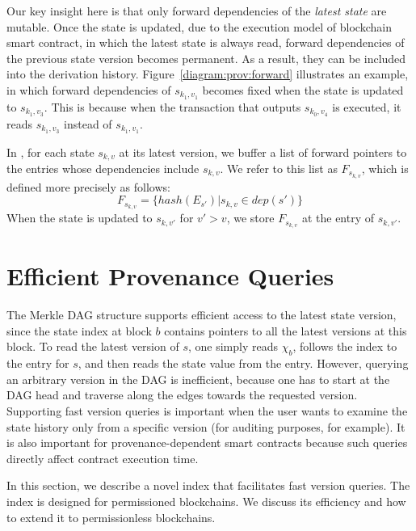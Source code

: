 Our key insight here is that only forward dependencies of the {\em latest state} are mutable. Once the state
is updated, due to the execution model of blockchain smart contract, in which the latest state is always read,
forward dependencies of the previous state version becomes permanent. As a result, they can be included into
the derivation history. Figure~\ref{diagram:prov:forward} illustrates an example, in which forward dependencies of
$s_{k_1, v_1}$ becomes fixed when the state is updated to $s_{k_1, v_3}$. This is because when the transaction
that
outputs $s_{k_0, v_4}$ is executed, it reads $s_{k_1, v_3}$ instead of $s_{k_1, v_1}$. 

In {\fs}, for each state $s_{k,v}$ at its latest version, we buffer a list of forward pointers to the
entries whose dependencies include $s_{k,v}$.  We refer to this list as $F_{s_{k,v}}$, which is defined more precisely as
follows: 
\begin{displaymath}
F_{s_{k,v}} = \{hash (E_{s'}) | s_{k,v} \in dep(s')\}
\end{displaymath}
\noindent When the state is updated to $s_{k,v'}$ for $v' > v$, we store $F_{s_{k,v}}$ at the entry of
$s_{k,v'}$.  

\section{Efficient Provenance Queries}
\label{sec:provenance:index}
The Merkle DAG structure supports efficient access to the latest state version, since the state index at block
$b$ contains pointers to all the latest versions at this block. To read the latest version of $s$, one simply
reads $\chi_b$, follows the index to the entry for $s$, and then reads the state value from the entry.
However, querying an arbitrary version in the DAG is inefficient, because one has to start at the DAG head
and traverse along the edges towards the requested version.  Supporting fast version queries is important
when the user wants to examine the state history only from a specific version (for auditing purposes, for
example).  It is also important for provenance-dependent smart contracts because such queries directly affect
contract execution time. 

In this section, we describe a novel index that facilitates fast version queries. The index is designed for
permissioned blockchains. We discuss its efficiency and how to extend it to permissionless blockchains. 

